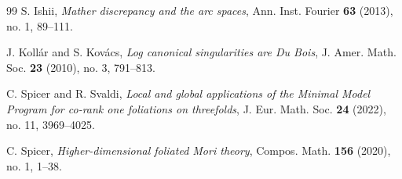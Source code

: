 \documentclass[11pt]{amsart}
\numberwithin{equation}{section}
\theoremstyle{plain}
\theoremstyle{definition}
\def\bibaut#1{{\sc #1}}
\begin{document}
\begin{thebibliography}{99}
\bibaut{S. Ishii},
\emph{Mather discrepancy and the arc spaces},
Ann. Inst. Fourier \textbf{63} (2013), no. 1, 89--111.

\bibaut{J. Koll\'ar and S. Kov\'acs},
\emph{Log canonical singularities are Du Bois},
J. Amer. Math. Soc. \textbf{23} (2010), no. 3, 791--813.

\bibaut{C. Spicer and R. Svaldi},
\emph{Local and global applications of the Minimal Model Program for co-rank one foliations on threefolds},
J. Eur. Math. Soc. \textbf{24} (2022), no. 11, 3969--4025.

\bibaut{C. Spicer},
\emph{Higher-dimensional foliated Mori theory},
Compos. Math. \textbf{156} (2020), no. 1, 1--38.

\end{thebibliography}
\end{document}
